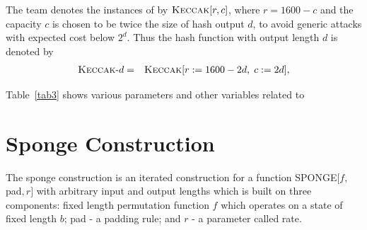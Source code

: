 The \Keccak{} team denotes the instances of \Keccak{} by $\mbox{\textsc{Keccak}}[r,c]$, where $r=1600-c$ and the capacity $c$ is chosen to be twice the size of hash output $d$, to avoid generic attacks with expected cost below $2^d$. Thus the hash function with output length $d$ is denoted by 
\begin{eqnarray}
\mbox{\mbox{\textsc{Keccak}}-$d$}  &=& \mbox{\textsc{Keccak}}[r:=1600-2d,\;c:=2d],
\end{eqnarray}
\begin{table}
\begin{center}
\caption{Parameters and Symbols used in \KECCAK{}}\label{tab3}
\end{center}
\end{table}

Table~\ref{tab3} shows various parameters and other variables related to \KECCAK{}

\section{Sponge Construction}

The sponge construction is an iterated construction for a function SPONGE$[f, $pad$, r]$ with arbitrary input and output lengths which is built on three components: fixed length permutation function $f$ which operates on a state of fixed length $b$; pad - a padding rule; and $r$ 
- a parameter called rate.

